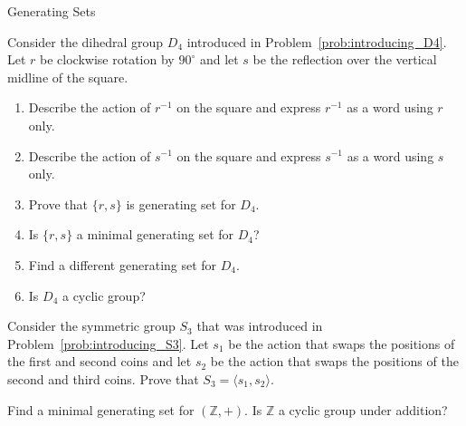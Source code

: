 \begin{section}{Generating Sets}
\begin{problem}\label{prob:revisiting_D4}
Consider the dihedral group $D_4$ introduced in Problem~\ref{prob:introducing_D4}. Let $r$ be clockwise rotation by $90^\circ$ and let $s$ be the reflection over the vertical midline of the square.
\begin{enumerate}[label=\textrm{(\alph*)}]
\item Describe the action of $r^{-1}$ on the square and express $r^{-1}$ as a word using $r$ only.
\item Describe the action of $s^{-1}$ on the square and express $s^{-1}$ as a word using $s$ only.
\item Prove that $\{r,s\}$ is generating set for $D_4$.
\item Is $\{r,s\}$ a minimal generating set for $D_4$?
\item Find a different generating set for $D_4$.
\item Is $D_4$ a cyclic group?
\end{enumerate} 
\end{problem}

\begin{problem}\label{prob:revisiting_S3}
Consider the symmetric group $S_3$ that was introduced in Problem~\ref{prob:introducing_S3}. Let $s_1$ be the action that swaps the positions of the first and second coins and let $s_2$ be the action that swaps the positions of the second and third coins. Prove that $S_3=\langle s_1, s_2\rangle$.
\end{problem}

\begin{problem}
Find a minimal generating set for $(\mathbb{Z},+)$.  Is $\mathbb{Z}$ a cyclic group under addition?
\end{problem}

\end{section}


